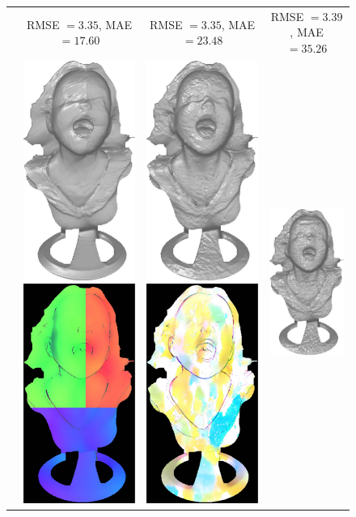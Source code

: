 \begin{figure}
{\begin{tabular}{cccc}
& {\small RMSE $= 3.35$, MAE $=17.60$} & {\small RMSE $= 3.35$, MAE $=23.48$} & {\small RMSE $= 3.39$, MAE $=35.26$} \\
\multirow{-15}{*}{\parbox[t]{2.5mm}{}}&
 \includegraphics[height=0.25\linewidth]{figures/result/comp_fusion_rgb_shape.pdf}
 \includegraphics[height=0.25\linewidth]{figures/result/comp_fusion_rgb_albedo.pdf} &
 \includegraphics[height=0.25\linewidth]{figures/result/comp_fusion_pattern_shape.pdf} 
\includegraphics[height=0.25\linewidth]{figures/result/comp_fusion_pattern_albedo.pdf} &
\includegraphics[height=0.25\linewidth]{figures/result/comp_fusion_love_shape.pdf} 

\end{tabular}}
\end{figure}
